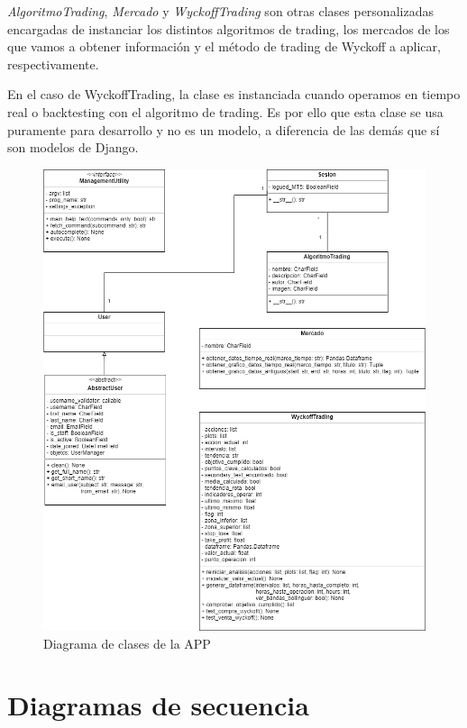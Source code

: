\textit{AlgoritmoTrading}, \textit{Mercado} y \textit{WyckoffTrading} son otras clases personalizadas encargadas de instanciar los distintos algoritmos de trading, los mercados de los que vamos a obtener información y el método de trading de Wyckoff a aplicar, respectivamente. \newline

En el caso de WyckoffTrading, la clase es instanciada cuando operamos en tiempo real o backtesting con el algoritmo de trading. Es por ello que esta clase se usa puramente para desarrollo y no es un modelo, a diferencia de las demás que sí son modelos de Django.\newline

\begin{figure}[h]
	\includegraphics[width=1.2\textwidth]{imagenes/diagrama_clases.png}
	\caption{Diagrama de clases de la APP} \label{diagrama_clases}
\end{figure}

\section{Diagramas de secuencia}

